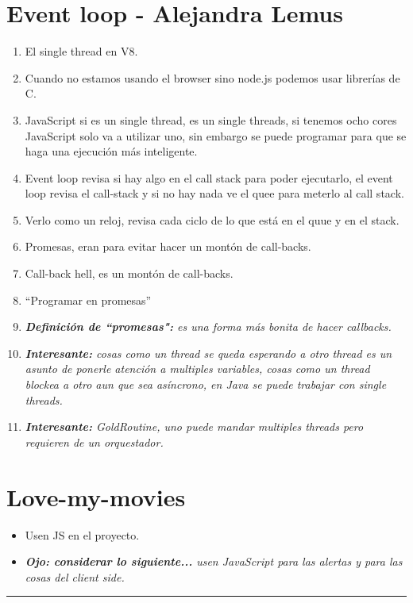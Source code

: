 \section{Event loop - Alejandra Lemus}
\begin{enumerate}
    \item El single thread en V8.
    \item Cuando no estamos usando el browser sino node.js podemos usar librerías de C.
    \item JavaScript si es un single thread, es un single threads, si tenemos ocho cores JavaScript solo va a utilizar uno, sin embargo se puede programar para que se haga una ejecución más inteligente.
    \item Event loop revisa si hay algo en el call stack para poder ejecutarlo, el event loop revisa el call-stack y si no hay nada ve el quee para meterlo al call stack.
    \item Verlo como un reloj, revisa cada ciclo de lo que está en el quue y en el stack.
    \item Promesas, eran para evitar hacer un montón de call-backs.
    \item Call-back hell, es un montón de call-backs.
    \item ``Programar en promesas''
    \item \emph{\textbf{Definición de ``promesas":} es una forma más bonita de hacer callbacks.}
    \item \emph{\textbf{Interesante:} cosas como un thread se queda esperando a otro thread es un asunto de ponerle atención a multiples variables, cosas como un thread blockea a otro aun que sea asíncrono, en Java se puede trabajar con single threads.}
    \item \emph{\textbf{Interesante:} GoldRoutine, uno puede mandar multiples threads pero requieren de un orquestador.}    
\end{enumerate}

\section{Love-my-movies}
\begin{itemize}
    \item Usen JS en el proyecto.
    \item \emph{\textbf{Ojo: considerar lo siguiente...} usen JavaScript para las alertas y para las cosas del client side.}
\end{itemize}


\rule{16cm}{1pt}

